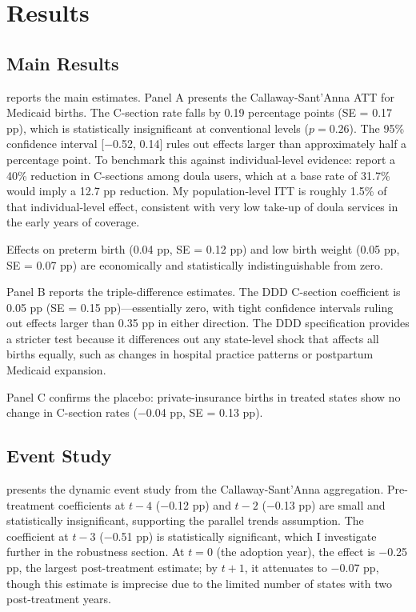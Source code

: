 \documentclass[12pt]{article}
\begin{document}
\section{Results}

\subsection{Main Results}

 reports the main estimates. Panel A presents the Callaway-Sant'Anna ATT for Medicaid births. The C-section rate falls by 0.19 percentage points (SE = 0.17 pp), which is statistically insignificant at conventional levels ($p = 0.26$). The 95\% confidence interval [$-$0.52, 0.14] rules out effects larger than approximately half a percentage point. To benchmark this against individual-level evidence: \citet{kozhimannil2013} report a 40\% reduction in C-sections among doula users, which at a base rate of 31.7\% would imply a 12.7 pp reduction. My population-level ITT is roughly 1.5\% of that individual-level effect, consistent with very low take-up of doula services in the early years of coverage.

Effects on preterm birth (0.04 pp, SE = 0.12 pp) and low birth weight (0.05 pp, SE = 0.07 pp) are economically and statistically indistinguishable from zero.

Panel B reports the triple-difference estimates. The DDD C-section coefficient is 0.05 pp (SE = 0.15 pp)---essentially zero, with tight confidence intervals ruling out effects larger than 0.35 pp in either direction. The DDD specification provides a stricter test because it differences out any state-level shock that affects all births equally, such as changes in hospital practice patterns or postpartum Medicaid expansion.

Panel C confirms the placebo: private-insurance births in treated states show no change in C-section rates ($-$0.04 pp, SE = 0.13 pp).



\subsection{Event Study}

 presents the dynamic event study from the Callaway-Sant'Anna aggregation. Pre-treatment coefficients at $t-4$ ($-$0.12 pp) and $t-2$ ($-$0.13 pp) are small and statistically insignificant, supporting the parallel trends assumption. The coefficient at $t-3$ ($-$0.51 pp) is statistically significant, which I investigate further in the robustness section. At $t=0$ (the adoption year), the effect is $-$0.25 pp, the largest post-treatment estimate; by $t+1$, it attenuates to $-$0.07 pp, though this estimate is imprecise due to the limited number of states with two post-treatment years.
\end{document}
